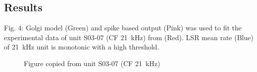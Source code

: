 \documentclass{article}
\begin{document}


\subsection{Results}
Fig. 4: Golgi model (Green) and spike based output (Pink) was used to
fit the experimental data of unit S03-07 (CF 21~kHz) from
\citep{GhoshalKim:1996} (Red).  LSR mean rate (Blue) of 21~kHz unit is
monotonic with a high threshold.

\begin{figure}[htb]
  \centering
\caption{Figure copied from \citep{GhoshalKim:1997} unit S03-07 (CF 21~kHz)}
\end{figure}
\end{document}
